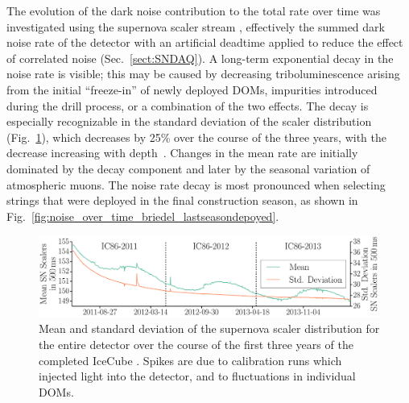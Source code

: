 The evolution of the dark noise contribution to the total rate over time was investigated using the
supernova scaler stream \cite{IC3:supernova, briedel_phd}, effectively 
the summed dark noise rate of the detector with an artificial deadtime
applied to reduce the effect of correlated noise
(Sec.~\ref{sect:SNDAQ}). A long-term exponential decay in 
the noise rate is visible; this may be caused by 
decreasing triboluminescence arising from the initial ``freeze-in''
of newly deployed DOMs, impurities introduced during the drill
process, or a combination of the two effects.  The decay
is especially recognizable in the standard deviation of the scaler
distribution (Fig.~\ref{fig:noise_over_time_briedel}), which decreases by
25\% over the course of the three years, with the decrease increasing with
depth~\cite{Piegsa09}. Changes in the mean rate are
initially dominated by the decay component and later by the seasonal
variation of atmospheric muons. The noise
rate decay is most pronounced when selecting strings
that were deployed in the final construction season, as shown in
Fig.~\ref{fig:noise_over_time_briedel_lastseasondepoyed}.


\begin{figure}[!h]
 \centering
 \includegraphics[width=1.0\textwidth]{graphics/dom/performance/darknoise/SN_Scalers_Whole_Detector_Mean_Variance_IC86_2011_2012_2013_smaller_height.pdf}
 \caption{Mean and standard deviation of the supernova scaler distribution for the
   entire detector over the course of the first three years of the
   completed IceCube \cite{briedel_phd}. Spikes are due to calibration
 runs which injected light into the detector, and to fluctuations in
 individual DOMs.} 
 \label{fig:noise_over_time_briedel}
\end{figure}

